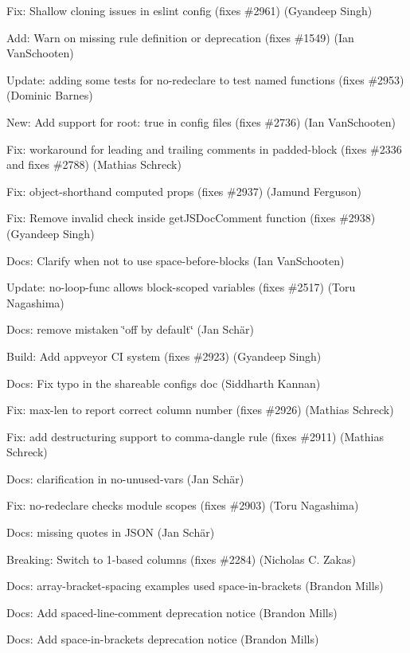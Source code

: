 \begin{DoxyItemize}
\item Fix\+: Shallow cloning issues in eslint config (fixes \#2961) (Gyandeep Singh)
\item Add\+: Warn on missing rule definition or deprecation (fixes \#1549) (Ian Van\+Schooten)
\item Update\+: adding some tests for no-\/redeclare to test named functions (fixes \#2953) (Dominic Barnes)
\item New\+: Add support for root\+: true in config files (fixes \#2736) (Ian Van\+Schooten)
\item Fix\+: workaround for leading and trailing comments in padded-\/block (fixes \#2336 and fixes \#2788) (Mathias Schreck)
\item Fix\+: object-\/shorthand computed props (fixes \#2937) (Jamund Ferguson)
\item Fix\+: Remove invalid check inside {\ttfamily get\+J\+S\+Doc\+Comment} function (fixes \#2938) (Gyandeep Singh)
\item Docs\+: Clarify when not to use space-\/before-\/blocks (Ian Van\+Schooten)
\item Update\+: {\ttfamily no-\/loop-\/func} allows block-\/scoped variables (fixes \#2517) (Toru Nagashima)
\item Docs\+: remove mistaken \char`\"{}off by default\char`\"{} (Jan Schär)
\item Build\+: Add appveyor CI system (fixes \#2923) (Gyandeep Singh)
\item Docs\+: Fix typo in the shareable configs doc (Siddharth Kannan)
\item Fix\+: max-\/len to report correct column number (fixes \#2926) (Mathias Schreck)
\item Fix\+: add destructuring support to comma-\/dangle rule (fixes \#2911) (Mathias Schreck)
\item Docs\+: clarification in no-\/unused-\/vars (Jan Schär)
\item Fix\+: {\ttfamily no-\/redeclare} checks module scopes (fixes \#2903) (Toru Nagashima)
\item Docs\+: missing quotes in J\+S\+ON (Jan Schär)
\item Breaking\+: Switch to 1-\/based columns (fixes \#2284) (Nicholas C. Zakas)
\item Docs\+: array-\/bracket-\/spacing examples used space-\/in-\/brackets (Brandon Mills)
\item Docs\+: Add spaced-\/line-\/comment deprecation notice (Brandon Mills)
\item Docs\+: Add space-\/in-\/brackets deprecation notice (Brandon Mills)

\end{DoxyItemize}
